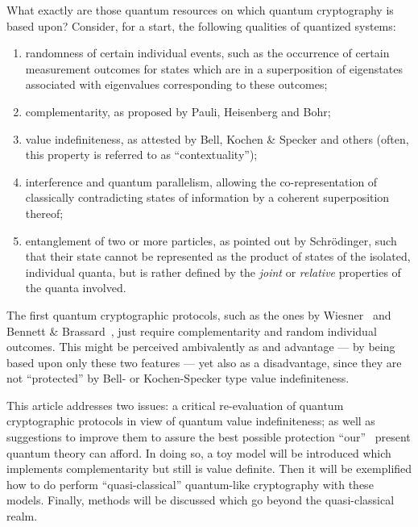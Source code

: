 \documentclass[12pt]{elsarticle}%
\begin{document}
What exactly are those quantum resources on which quantum cryptography is based upon?
Consider, for a start,  the following qualities of quantized systems:
\renewcommand{\labelenumi}{(\roman{enumi})}
\begin{enumerate}
\item
randomness of certain individual events,
such as the occurrence of certain measurement outcomes
for states which are in a  superposition of eigenstates
associated with eigenvalues corresponding to these outcomes;
\item
complementarity, as proposed by Pauli, Heisenberg and Bohr;
\item
value indefiniteness, as attested by Bell, Kochen \& Specker and others
(often, this property is referred to as ``contextuality'');
\item
interference and quantum parallelism, allowing the co-representation of classically contradicting states of information
by a coherent superposition thereof;
\item
entanglement of two or more particles,
as pointed out by Schr\"odinger, such that their state cannot be represented
as the product of states of the isolated, individual quanta,
but is rather defined by the {\em joint} or {\em relative} properties of the quanta involved.
\end{enumerate}

The first quantum cryptographic protocols, such as the ones by Wiesner~\cite{wiesner} and
Bennett \& Brassard~\cite{benn-84,benn-92},
just require complementarity and random individual outcomes.
This might be perceived ambivalently as and advantage --- by being based upon only these two features ---
yet also as a disadvantage, since they are not ``protected'' by Bell- or Kochen-Specker type
value indefiniteness.

This article addresses two issues: a critical re-evaluation
of quantum cryptographic protocols in view
of quantum value indefiniteness;
as well as suggestions to improve them to assure the best possible protection
``our''~\cite[p.~866]{born-26-1} present quantum theory can afford.
In doing so, a toy model will be introduced which implements complementarity but still
is value definite.
Then it will be exemplified how to do perform ``quasi-classical'' quantum-like cryptography
with these models.
Finally, methods will be discussed which go beyond the quasi-classical realm.
\end{document}
